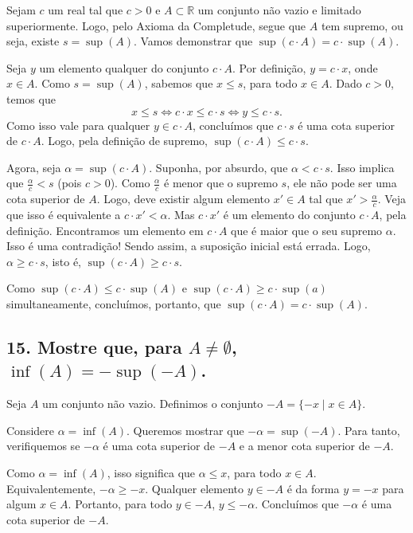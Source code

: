 \documentclass[12pt]{article}
\begin{document}
	Sejam $c$ um real tal que $c > 0$ e $A \subset \mathbb{R}$ um conjunto não vazio e limitado superiormente. Logo, pelo Axioma da Completude, segue que $A$ tem supremo, ou seja, existe $s = \sup(A)$. Vamos demonstrar que $\sup(c \cdot A) = c \cdot \sup(A)$.
	
	Seja $y$ um elemento qualquer do conjunto $c \cdot A$. Por definição, $y = c \cdot x$, onde $x \in A$. Como $s = \sup(A)$, sabemos que $x \leq s$, para todo $x \in A$. Dado $c > 0$, temos que
	\[
	x \leq s \iff c \cdot x \leq c \cdot s \iff y \leq c \cdot s.
	\]
	Como isso vale para qualquer $y \in c \cdot A$, concluímos que $c \cdot s$ é uma cota superior de $c \cdot A$. Logo, pela definição de supremo, $\sup(c \cdot A) \leq c \cdot s$.
	
	Agora, seja $\alpha = \sup(c \cdot A)$. Suponha, por absurdo, que $\alpha < c \cdot s$. Isso implica que $\frac{\alpha}{c} < s$ (pois $c > 0$). Como $\frac{\alpha}{c}$ é menor que o supremo $s$, ele não pode ser uma cota superior de $A$. Logo, deve existir algum elemento $x' \in A$ tal que $x' > \frac{\alpha}{c}$. Veja que isso é equivalente a $c \cdot x' < \alpha$. Mas $c \cdot x'$ é um elemento do conjunto $c \cdot A$, pela definição. Encontramos um elemento em $c \cdot A$ que é maior que o seu supremo $\alpha$. Isso é uma contradição! Sendo assim, a suposição inicial está errada. Logo, $\alpha \geq c \cdot s$, isto é, $\sup(c \cdot A) \geq c \cdot s$.
	
	Como $\sup(c \cdot A) \leq c \cdot \sup(A)$ e $\sup(c \cdot A) \geq c \cdot \sup(a)$ simultaneamente, concluímos, portanto, que $\sup(c \cdot A) = c \cdot \sup(A)$. \blacksquare
	
	\subsection*{15. Mostre que, para $A \neq \emptyset$, $\inf(A) = -\sup(-A)$.}
	
	Seja $A$ um conjunto não vazio. Definimos o conjunto $-A = \{-x \mid x \in A\}$.
	
	Considere $\alpha = \inf(A)$. Queremos mostrar que $-\alpha = \sup(-A)$. Para tanto, verifiquemos se $-\alpha$ é uma cota superior de $-A$ e a menor cota superior de $-A$.
	
	Como $\alpha = \inf(A)$, isso significa que $\alpha \leq x$, para todo $x \in A$. Equivalentemente, $-\alpha \geq -x$. Qualquer elemento $y \in -A$ é da forma $y = -x$ para algum $x \in A$. Portanto, para todo $y \in -A$, $y \leq -\alpha$. Concluímos que $-\alpha$ é uma cota superior de $-A$.
	
\end{document}
